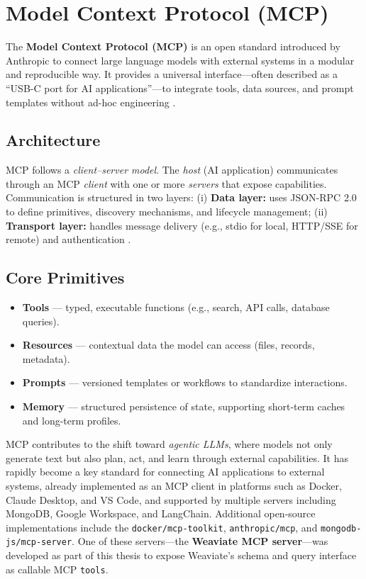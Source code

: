 \section{Model Context Protocol (MCP)}

The \textbf{Model Context Protocol (MCP)} is an open standard introduced by Anthropic to connect large language models with external systems in a modular and reproducible way. It provides a universal interface---often described as a ``USB-C port for AI applications''---to integrate tools, data sources, and prompt templates without ad-hoc engineering \cite{mcp-intro}.

\subsection{Architecture} 
MCP follows a \textit{client--server model}. The \textit{host} (AI application) communicates through an MCP \textit{client} with one or more \textit{servers} that expose capabilities. Communication is structured in two layers:
(i) \textbf{Data layer:} uses JSON-RPC 2.0 to define primitives, discovery mechanisms, and lifecycle management;
(ii) \textbf{Transport layer:} handles message delivery (e.g., stdio for local, HTTP/SSE for remote) and authentication \cite{mcp-architecture}.


\subsection{Core Primitives} 
\begin{itemize}
  \item \textbf{Tools} --- typed, executable functions (e.g., search, API calls, database queries).
  \item \textbf{Resources} --- contextual data the model can access (files, records, metadata).
  \item \textbf{Prompts} --- versioned templates or workflows to standardize interactions.
  \item \textbf{Memory} --- structured persistence of state, supporting short-term caches and long-term profiles.
\end{itemize}

MCP contributes to the shift toward \textit{agentic LLMs}, where models not only generate text but also plan, act, and learn through external capabilities.  
It has rapidly become a key standard for connecting AI applications to external systems, already implemented as an MCP client in platforms such as Docker, Claude Desktop, and VS Code, and supported by multiple servers including MongoDB, Google Workspace, and LangChain.  
Additional open-source implementations include the \texttt{docker/mcp-toolkit}, \texttt{anthropic/mcp}, and \texttt{mongodb-js/mcp-server}.  
One of these servers—the \textbf{Weaviate MCP server}—was developed as part of this thesis to expose Weaviate’s schema and query interface as callable MCP \texttt{tools}.  

